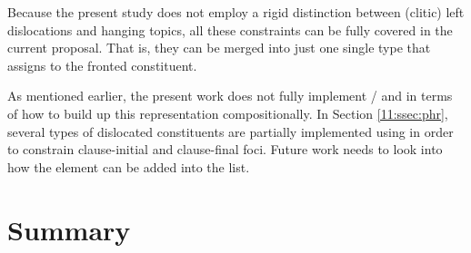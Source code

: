 Because the present study does not employ a rigid distinction between
(clitic) left dislocations and hanging topics, all these constraints
can be fully covered in the current proposal. That is,
they can be merged into just one single type that assigns
 to the fronted constituent. 





As mentioned earlier, the present work does not fully implement
/  and  in terms
of how to build up this representation compositionally. In
Section \ref{11:ssec:phr}, several types of dislocated constituents are
partially implemented using  in order to
constrain clause-initial and clause-final foci. Future work needs to
look into how the  element can be added into the
 list.





\section{Summary}
\label{10-4:sec:summary}


